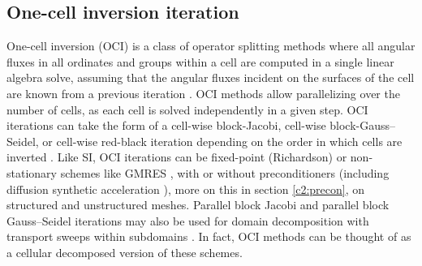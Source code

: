 


\subsection{One-cell inversion iteration}
\label{c2:oci}

One-cell inversion (OCI) is a class of operator splitting methods where all angular fluxes in all ordinates and groups within a cell are computed in a single linear algebra solve, assuming that the angular fluxes incident on the surfaces of the cell are known from a previous iteration \cite{kang2000oci}.
OCI methods allow parallelizing over the number of cells, as each cell is solved independently in a given step.
OCI iterations can take the form of a cell-wise block-Jacobi, cell-wise block-Gauss--Seidel, or cell-wise red-black iteration depending on the order in which cells are inverted \cite{man1994parallel}.
Like SI, OCI iterations can be fixed-point (Richardson) or non-stationary schemes like GMRES \cite{kylov2004warsa}, with or without preconditioners (including diffusion synthetic acceleration \cite{kang2000oci}), more on this in section \ref{c2:precon}, on structured and unstructured meshes.
Parallel block Jacobi and parallel block Gauss--Seidel iterations may also be used for domain decomposition with transport sweeps within subdomains \cite{qiao_improved_2021}.
In fact, OCI methods can be thought of as a cellular decomposed version of these schemes.

